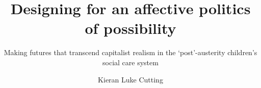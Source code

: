 \title{\LARGE Designing for an affective politics of possibility}

\subtitle{\large Making futures that transcend capitalist realism in the `post'-austerity children's social care system}

\author{Kieran Luke Cutting}








\subject{LaTeX} 